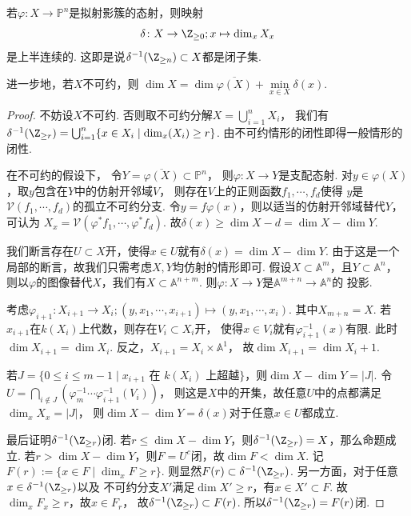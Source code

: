     \begin{theorem}
        若$\varphi\colon X \rightarrow \mathbb{P}^{n}$是拟射影簇的态射，则映射
        \[ \delta\colon X \rightarrow \Z_{\geq 0};x \mapsto \dim_{x}X_{x}\]
        是上半连续的. 这即是说$\delta^{-1}(\Z_{\geq n}) \subset X$都是闭子集.

        进一步地，若$X$不可约，则
        $\dim X = \dim \overline{\varphi(X)} + \min\limits_{x \in X}\delta(x)$.
    \end{theorem}
    \begin{proof}
        不妨设$X$不可约. 否则取不可约分解$X = \bigcup_{i=1}^{n}X_{i}$，
        我们有$\delta^{-1}(\Z_{\geq r}) 
        = \bigcup_{i=1}^{n}\{x \in X_{i} \mid \dim_{x}(X_{i}) \geq r\}$. 
        由不可约情形的闭性即得一般情形的闭性.

        在不可约的假设下，
        令$Y = \overline{\varphi(X)} \subset \mathbb{P}^{n}$，
        则$\varphi\colon X \rightarrow Y$是支配态射.
        对$y \in \varphi(X)$，取$y$包含在$Y$中的仿射开邻域$V$，
        则存在$V$上的正则函数$f_{1},\cdots,f_{d}$使得
        $y$是$\mathcal{V}(f_{1},\cdots,f_{d})$的孤立不可约分支.
        令$y=f\varphi(x)$，则以适当的仿射开邻域替代$Y$，可认为
        $X_{x}=\mathcal{V}(\varphi^{*}f_{1},\cdots,\varphi^{*}f_{d})$.
        故$\delta(x) \geq \dim X - d = \dim X - \dim Y$.

        我们断言存在$U \subset X$开，使得$x \in U$就有$\delta(x)=\dim X -\dim Y$.
        由于这是一个局部的断言，故我们只需考虑$X,Y$均仿射的情形即可.
        假设$X \subset \mathbb{A}^{m}$，且$Y \subset \mathbb{A}^{n}$，
        则以$\varphi$的图像替代$X$，我们有$X \subset \mathbb{A}^{n+m}$.
        则$\varphi\colon X \rightarrow Y$是$\mathbb{A}^{m+n} \rightarrow \mathbb{A}^{n}$的
        投影. 

        考虑$\varphi_{i+1}\colon X_{i+1} \rightarrow X_{i};(y,x_{1},\cdots,x_{i+1}) \mapsto (y,x_{1},\cdots,x_{i})$.
        其中$X_{m+n}=X$. 若$x_{i+1}$在$k(X_{i})$上代数，则存在$V_{i} \subset X_{i}$开，
        使得$x \in V_{i}$就有$\varphi_{i+1}^{-1}(x)$有限. 此时$\dim X_{i+1} = \dim X_{i}$.
        反之，$X_{i+1}=X_{i}\times\mathbb{A}^{1}$，
        故$\dim X_{i+1} = \dim X_{i} + 1$.

        若$J=\{0 \leq i \leq m-1 \mid x_{i+1}\text{ 在 }k(X_{i})\text{ 上超越}\}$，则$\dim X - \dim Y=|J|$.
        令$U = \bigcap_{i \notin J}(\varphi_{m}^{-1}\cdots\varphi_{i+1}^{-1}(V_{i}))$，
        则这是$X$中的开集，故任意$U$中的点都满足$\dim_{x}X_{x}=|J|$，
        则$\dim X - \dim Y =\delta(x)$对于任意$x \in U$都成立.

        最后证明$\delta^{-1}(\Z_{\geq r})$闭. 
        若$r \leq \dim X - \dim Y$，则$\delta^{-1}(\Z_{\geq r})=X$，那么命题成立.
        若$r > \dim X -\dim Y$，则$F = U^{c}$闭，故$\dim F < \dim X$.
        记$F(r):=\{x \in F \mid \dim_{x}F \geq r\}$. 
        则显然$F(r) \subset \delta^{-1}(\Z_{\geq r})$.
        另一方面，对于任意$x \in \delta^{-1}(\Z_{\geq r})$以及
        不可约分支$X'$满足$\dim X' \geq r$，有$x \in X' \subset F$.
        故$\dim_{x}F_{x} \geq r$，故$x \in F_{r}$，
        故$\delta^{-1}(\Z_{\geq r}) \subset F(r)$.
        所以$\delta^{-1}(\Z_{\geq r}) = F(r)$闭.
    \end{proof}

